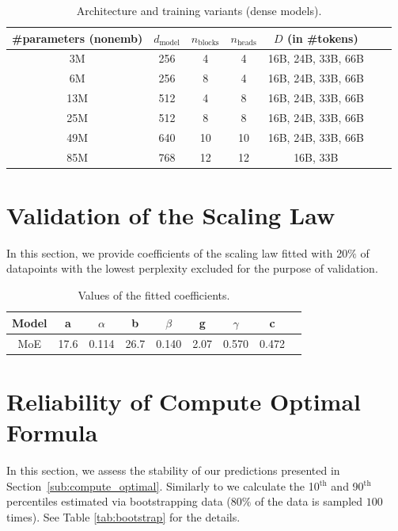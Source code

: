 \documentclass{article} %
\theoremstyle{plain}
\theoremstyle{definition}
\theoremstyle{remark}
\newcommand{\dmodel}{d_\text{model}}
\newcommand{\nblocks}{n_\text{blocks}}
\newcommand{\nheads}{n_\text{heads}}
\begin{document}
\begin{table}[h] \label{table_dense}
    \centering
    \caption{Architecture and training variants (dense models).}
    \vspace{0.4cm}
    \begin{tabular}{ccccccc}
    \toprule
        \#parameters (nonemb) & $\dmodel$ & $\nblocks$ & $\nheads$ & $D$ (in \#tokens) \\
        \midrule
        3M  & 256 & 4 & 4 & 16B, 24B, 33B, 66B \\
        6M & 256 & 8 & 4 & 16B, 24B, 33B, 66B \\
        13M & 512 & 4 & 8 & 16B, 24B, 33B, 66B \\
        25M & 512 & 8 & 8 & 16B, 24B, 33B, 66B \\
        49M & 640 & 10 & 10 & 16B, 24B, 33B, 66B \\
        85M & 768 & 12 & 12 & 16B, 33B \\
        \bottomrule
    \end{tabular}
    \label{tab:dense}
\end{table}

\newpage
\section{Validation of the Scaling Law}\label{app:coeffs_valid}
In this section, we provide coefficients of the scaling law fitted with 20$\%$ of datapoints with the lowest perplexity excluded for the purpose of validation.

\begin{table}[h]
    \centering
    \caption{Values of the fitted coefficients.}
    \vspace{0.4cm}
    \begin{tabular}{c|c|c|c|c|c|c|c|c}
        Model  & a & $\alpha$ & b & $\beta$ & g & $\gamma$ & c \\
        \hline
        MoE  & 17.6 & 0.114 & 26.7 & 0.140 & 2.07 & 0.570 & 0.472 \\ 
    \end{tabular}
    \label{tab:coeffs_valid}
\end{table}

\section{Reliability of Compute Optimal Formula}\label{app:reliabiliy}
In this section, we assess the stability of our predictions presented in Section~\ref{sub:compute_optimal}. Similarly to \cite{hoffmann2022training} we calculate the 10$^\text{th}$ and 90$^\text{th}$ percentiles estimated via bootstrapping data ($80\%$ of the data is sampled $100$ times). See Table \ref{tab:bootstrap} for the details.
\end{document}
